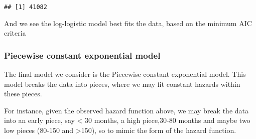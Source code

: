 \documentclass[
]{article}
\newenvironment{Shaded}{\begin{snugshade}}{\end{snugshade}}
\newcommand{\CommentTok}[1]{\textcolor[rgb]{0.56,0.35,0.01}{\textit{#1}}}
\newcommand{\DataTypeTok}[1]{\textcolor[rgb]{0.13,0.29,0.53}{#1}}
\newcommand{\DecValTok}[1]{\textcolor[rgb]{0.00,0.00,0.81}{#1}}
\newcommand{\FloatTok}[1]{\textcolor[rgb]{0.00,0.00,0.81}{#1}}
\newcommand{\KeywordTok}[1]{\textcolor[rgb]{0.13,0.29,0.53}{\textbf{#1}}}
\newcommand{\NormalTok}[1]{#1}
\newcommand{\OperatorTok}[1]{\textcolor[rgb]{0.81,0.36,0.00}{\textbf{#1}}}
\newcommand{\StringTok}[1]{\textcolor[rgb]{0.31,0.60,0.02}{#1}}
\begin{document}
\begin{Shaded}
\end{Shaded}

\begin{verbatim}
## [1] 41082
\end{verbatim}

And we see the log-logistic model best fits the data, based on the
minimum AIC criteria

\hypertarget{piecewise-constant-exponential-model}{%
\subsubsection{Piecewise constant exponential
model}\label{piecewise-constant-exponential-model}}

The final model we consider is the Piecewise constant exponential model.
This model breaks the data into pieces, where we may fit constant
hazards within these pieces.

For instance, given the observed hazard function above, we may break the
data into an early piece, say \textless{} 30 months, a high piece,30-80
months and maybe two low pieces (80-150 and \textgreater150), so to
mimic the form of the hazard function.

\begin{Shaded}
\end{Shaded}
\end{document}
